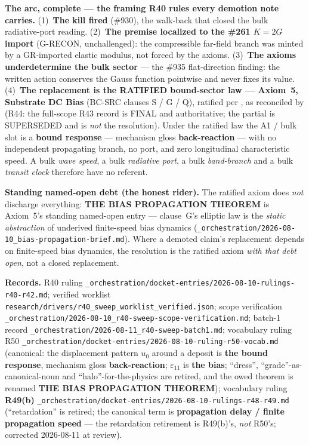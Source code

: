 \noindent\textbf{The arc, complete --- the framing R40 rules every demotion note
carries.} (1)~\textbf{The kill fired} (\#930), the walk-back that closed the bulk
radiative-port reading. (2)~\textbf{The premise localized to the \#261 $K = 2G$ import}
(G-RECON, unchallenged): the compressible far-field branch was minted by a GR-imported
elastic modulus, not forced by the axioms. (3)~\textbf{The axioms underdetermine the bulk
sector} --- the \#935 flat-direction finding: the written action conserves the Gauss
function pointwise and never fixes its value. (4)~\textbf{The replacement is the RATIFIED
bound-sector law --- Axiom~5, Substrate DC Bias} (BC-SRC clauses S / G / Q), ratified per
\texttt{}, as reconciled by \texttt{} (R44: the
full-scope R43 record is FINAL and authoritative; the partial
\texttt{} is SUPERSEDED and is \emph{not} the
resolution). Under the ratified law the A1 / bulk slot is a \textbf{bound response} ---
mechanism gloss \textbf{back-reaction} --- with no independent propagating branch, no port,
and zero longitudinal characteristic speed. A bulk \emph{wave speed}, a bulk \emph{radiative
port}, a bulk \emph{band-branch} and a bulk \emph{transit clock} therefore have no referent.

\noindent\textbf{Standing named-open debt (the honest rider).} The ratified axiom does
\emph{not} discharge everything: \textbf{THE BIAS PROPAGATION THEOREM} is Axiom~5's standing
named-open entry --- clause~G's elliptic law is the \emph{static abstraction} of underived
finite-speed bias dynamics (\texttt{\_orchestration/2026-08-10\_bias-propagation-brief.md}). Where a demoted claim's
replacement depends on finite-speed bias dynamics, the resolution is the ratified axiom
\emph{with that debt open}, not a closed replacement.

\noindent\textbf{Records.} R40 ruling \texttt{\_orchestration/docket-entries/2026-08-10-rulings-r40-r42.md}; verified worklist
\texttt{research/drivers/r40\_sweep\_worklist\_verified.json}; scope verification \texttt{\_orchestration/2026-08-10\_r40-sweep-scope-verification.md};
batch-1 record \texttt{\_orchestration/2026-08-11\_r40-sweep-batch1.md}; vocabulary ruling R50
\texttt{\_orchestration/docket-entries/2026-08-10-ruling-r50-vocab.md} (canonical: the displacement pattern $u_0$ around a deposit is
\textbf{the bound response}, mechanism gloss \textbf{back-reaction}; $\varepsilon_{11}$ is
\textbf{the bias}; ``dress'', ``grade''-as-canonical-noun and ``halo''-for-the-physics are
retired, and the owed theorem is renamed \textbf{THE BIAS PROPAGATION THEOREM}); vocabulary ruling
\textbf{R49(b)} \texttt{\_orchestration/docket-entries/2026-08-10-rulings-r48-r49.md}
(``retardation'' is retired; the canonical term is \textbf{propagation delay / finite propagation
speed} --- the retardation retirement is R49(b)'s, \emph{not} R50's; corrected 2026-08-11 at review).

